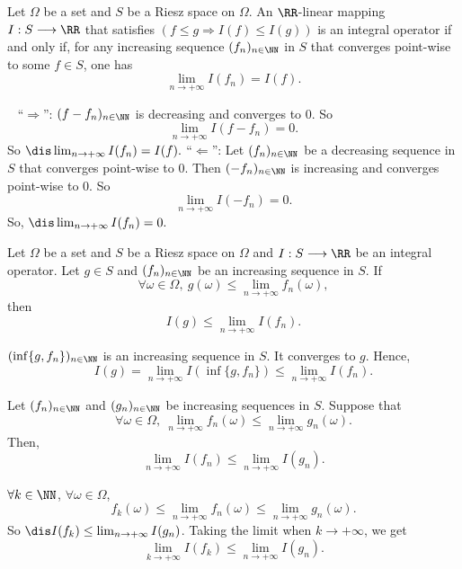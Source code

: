\begin{propositionenv}
    Let $\Omega$ be a set and $S$ be a Riesz space on $\Omega$. An $\RR$-linear mapping $I:S\longrightarrow \RR$ that satisfies $(f\le g\Rightarrow I(f)\le I(g))$ is an integral operator if and only if, for any increasing sequence $(f_n)_{n\in \NN}$ in $S$ that converges point-wise to some $f\in S$, one has
    $$ \lim_{n\rightarrow +\infty}I(f_n)=I(f).$$
\end{propositionenv}
\begin{proofenv}
    \ \newline
    ``$\Rightarrow$'': $(f-f_n)_{n\in\NN}$ is decreasing and converges to $0$. So
    $$ \lim_{n\rightarrow +\infty}I(f-f_n)=0.$$
    So $\dis \lim_{n\rightarrow +\infty}I(f_n)=I(f).$
    \newline
    ``$\Leftarrow$'': Let $(f_n)_{n\in\NN}$ be a decreasing sequence in $S$ that converges point-wise to $0$. Then $(-f_n)_{n\in\NN}$ is increasing and converges point-wise to $0$. So
    $$ \lim_{n\rightarrow +\infty}I(-f_n)=0.$$
    So, $\dis \lim_{n\rightarrow +\infty}I(f_n)=0.$
\end{proofenv}
\begin{propositionenv}
    Let $\Omega$ be a set and $S$ be a Riesz space on $\Omega$ and $I: S\longrightarrow \RR$ be an integral operator. Let $g\in S$ and $(f_n)_{n\in\NN}$ be an increasing sequence in $S$. If
    $$ \forall \omega\in \Omega,\ g(\omega)\le \lim_{n\rightarrow +\infty}f_n(\omega),$$
    then
    $$ I(g) \le \lim_{n\rightarrow +\infty}I(f_n).$$
\end{propositionenv}
\begin{proofenv}
    $(\inf\{g,f_n\})_{n\in\NN}$ is an increasing sequence in $S$.
    It converges to $g$. Hence, 
    $$ I(g)=\lim_{n\rightarrow +\infty}I(\inf\{g,f_n\})\le \lim_{n\rightarrow +\infty}I(f_n).$$
\end{proofenv}
\begin{corollaryenv}
    Let $(f_n)_{n\in\NN}$ and $(g_n)_{n\in\NN}$ be increasing sequences in $S$. Suppose that 
    $$ \forall \omega\in \Omega,\ \lim_{n\rightarrow +\infty}f_n(\omega)\le \lim_{n\rightarrow +\infty}g_n(\omega).$$
    Then,
    $$ \lim_{n\rightarrow +\infty}I(f_n)\le \lim_{n\rightarrow +\infty}I(g_n).$$
\end{corollaryenv}
\begin{proofenv}
    $\forall k\in \NN$, $\forall \omega \in\Omega$,
    $$ f_k (\omega)\le \lim_{n\rightarrow +\infty}f_n(\omega)\le \lim_{n\rightarrow +\infty}g_n(\omega).$$
    So $\dis I(f_k)\le \lim_{n\rightarrow +\infty}I(g_n)$.
    Taking the limit when $k\rightarrow +\infty$, we get
    $$ \lim_{k\rightarrow +\infty}I(f_k)\le \lim_{n\rightarrow +\infty}I(g_n).$$
\end{proofenv}

